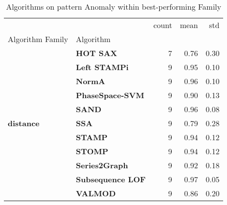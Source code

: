 \begin{table}
\caption{Algorithms on pattern Anomaly within best-performing Family}
\label{tab:bp-pattern}
\begin{tabular}{llrrr}
\toprule
 &  & count & mean & std \\
Algorithm Family & Algorithm &  &  &  \\
\midrule
\multirow[t]{11}{*}{\textbf{distance}} & \textbf{HOT SAX} & 7 & 0.76 & 0.30 \\
\textbf{} & \textbf{Left STAMPi} & 9 & 0.95 & 0.10 \\
\textbf{} & \textbf{NormA} & 9 & 0.96 & 0.10 \\
\textbf{} & \textbf{PhaseSpace-SVM} & 9 & 0.90 & 0.13 \\
\textbf{} & \textbf{SAND} & 9 & 0.96 & 0.08 \\
\textbf{} & \textbf{SSA} & 9 & 0.79 & 0.28 \\
\textbf{} & \textbf{STAMP} & 9 & 0.94 & 0.12 \\
\textbf{} & \textbf{STOMP} & 9 & 0.94 & 0.12 \\
\textbf{} & \textbf{Series2Graph} & 9 & 0.92 & 0.18 \\
\textbf{} & \textbf{Subsequence LOF} & 9 & 0.97 & 0.05 \\
\textbf{} & \textbf{VALMOD} & 9 & 0.86 & 0.20 \\
\cline{1-5}
\bottomrule
\end{tabular}
\end{table}

